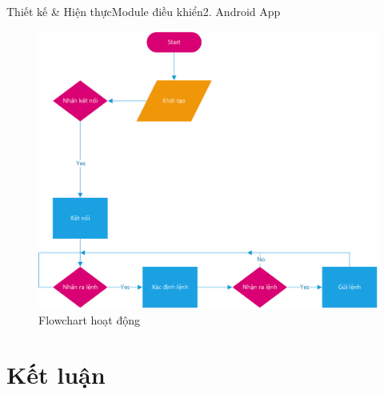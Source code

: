 \documentclass[compress, blue, 14pt,hyperref={pdfpagemode=FullScreen}]{beamer}
\begin{document}
\begin{frame}{Thiết kế \& Hiện thực}{Module điều khiển}{2. Android App}
\begin{figure}[hbtp]
\centering
\includegraphics[scale=0.45]{images/flowchart_app.png}
\caption{Flowchart hoạt động}
\end{figure}
\end{frame}
\section{Kết luận}
\section*{}\begin{frame}
\transdissolve
\begin{center}
\begin{Huge}
\color{blue}{Cảm ơn các thầy/cô đã lắng nghe}
\end{Huge}
\end{center}
\end{frame}
\end{document}

